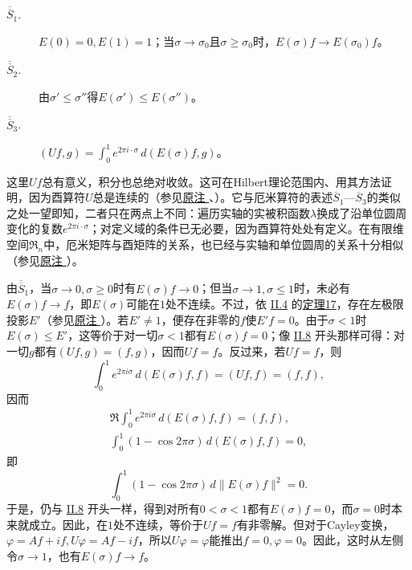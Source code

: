 \documentclass[fontsize=13pt,twoside,openany,headings=normal,parskip=false,bookmarkpackage=false,DIV=calc]{scrbook}
\begin{document}
\hypertarget{origpage-81}{}\label{origpage-81}\begin{description}
\item[$\overline{\overline S}_1$.]\leavevmode{}\label{cond:II.Sdouble1} $E(0)=0,\allowbreak E(1)=1$；当$\sigma\to\sigma_0$且$\sigma\geq\sigma_0$时，$E(\sigma)f\to E(\sigma_0)f$。
\item[$\overline{\overline S}_2$.]\leavevmode{}\label{cond:II.Sdouble2} 由$\sigma'\leq\sigma''$得$E(\sigma')\leq E(\sigma'')$。
\item[$\overline{\overline S}_3$.]\leavevmode{}\label{cond:II.Sdouble3} $(Uf,\allowbreak g)=\int_0^1e^{2\pi i\cdot\sigma}\,d(E(\sigma)f,\allowbreak g)$。
\end{description}
这里$Uf$总有意义，积分也总绝对收敛。这可在Hilbert理论范围内、用其方法证明，因为酉算符$U$总是连续的（参见\CJKglue \hyperlink{note-70}{原注 }、\hyperlink{note-101}{}）。它与厄米算符的表述$\hyperref[cond:II.Sbar1]{\overline S_1}$—$\hyperref[cond:II.Sbar3]{\overline S_3}$的类似之处一望即知，二者只在两点上不同：遍历实轴的实被积函数$\lambda$换成了沿单位圆周变化的复数$e^{2\pi i\cdot\sigma}$；对定义域的条件已无必要，因为酉算符处处有定义。在有限维空间$\mathfrak R_n$中，厄米矩阵与酉矩阵的关系，也已经与实轴和单位圆周的关系十分相似（参见\CJKglue \hyperlink{note-100}{原注 }）。

由$\hyperref[cond:II.Sdouble1]{\overline{\overline S}_1}$，当$\sigma\to0,\allowbreak \sigma\geq0$时有$E(\sigma)f\to0$；但当$\sigma\to1,\allowbreak \sigma\leq1$时，未必有$E(\sigma)f\to f$，即$E(\sigma)$可能在$1$处不连续。不过，依 \hyperref[sec:II.4]{II.4} 的\CJKglue \hyperref[thm:II.17]{定理17}，存在左极限投影$E'$（参见\CJKglue \hyperlink{note-79}{原注 }）。若$E'\ne1$，便存在非零的$f$使$E'f=0$。由于$\sigma<1$时$E(\sigma)\leq E'$，这等价于对一切$\sigma<1$都有$E(\sigma)f=0$；像 \hyperref[sec:II.8]{II.8} 开头那样可得：对一切$g$都有$(Uf,\allowbreak g)=(f,\allowbreak g)$，因而$Uf=f$。反过来，若$Uf=f$，则
\[
\int_0^1e^{2\pi i\sigma}\,d(E(\sigma)f,f)=(Uf,f)=(f,f),
\]
因而
\begin{gather*}
\mathfrak R\int_0^1e^{2\pi i\sigma}\,d(E(\sigma)f,f)=(f,f),\\
\int_0^1(1-\cos2\pi\sigma)\,d(E(\sigma)f,f)=0,
\end{gather*}
即
\[
\int_0^1(1-\cos2\pi\sigma)\,d\|E(\sigma)f\|^2=0.
\]
于是，仍与 \hyperref[sec:II.8]{II.8} 开头一样，得到对所有$0<\sigma<1$都有$E(\sigma)f=0$，而$\sigma=0$时本来就成立。因此，在$1$处不连续，等价于$Uf=f$有非零解。但对于Cayley变换，$\varphi=Af+if,\allowbreak U\varphi=Af-if$，所以$U\varphi=\varphi$能推出$f=0,\allowbreak \varphi=0$。因此，这时从左侧令$\sigma\to1$，也有$E(\sigma)f\to f$。
\end{document}
